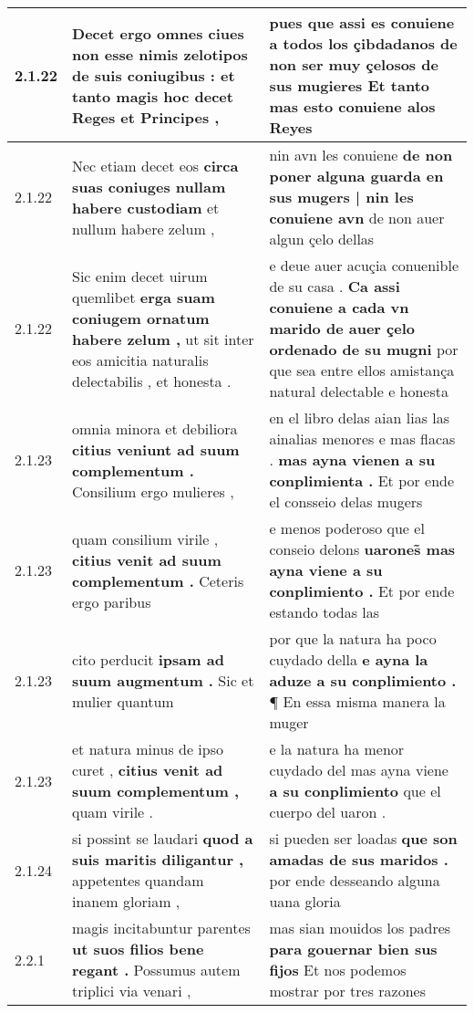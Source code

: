 \begin{tabular}{|p{1cm}|p{6.5cm}|p{6.5cm}|}
2.1.22 & Decet ergo omnes ciues \textbf{ non esse nimis zelotipos de suis coniugibus : } et tanto magis hoc decet Reges et Principes , & pues que assi es conuiene a todos los çibdadanos \textbf{ de non ser muy çelosos de sus mugieres } Et tanto mas esto conuiene alos Reyes \\\hline
2.1.22 & Nec etiam decet eos \textbf{ circa suas coniuges nullam habere custodiam } et nullum habere zelum , & nin avn les conuiene \textbf{ de non poner alguna guarda en sus mugers | nin les conuiene avn } de non auer algun çelo dellas \\\hline
2.1.22 & Sic enim decet uirum quemlibet \textbf{ erga suam coniugem ornatum habere zelum , } ut sit inter eos amicitia naturalis delectabilis , et honesta . & e deue auer acuçia conuenible de su casa . \textbf{ Ca assi conuiene a cada vn marido de auer çelo ordenado de su mugni } por que sea entre ellos amistança natural delectable e honesta \\\hline
2.1.23 & omnia minora et debiliora \textbf{ citius veniunt ad suum complementum . } Consilium ergo mulieres , & en el libro delas aian lias las ainalias menores e mas flacas . \textbf{ mas ayna vienen a su conplimienta . } Et por ende el consseio delas mugers \\\hline
2.1.23 & quam consilium virile , \textbf{ citius venit ad suum complementum . } Ceteris ergo paribus & e menos poderoso que el conseio delons \textbf{ uarones̃ mas ayna viene a su conplimiento . } Et por ende estando todas las \\\hline
2.1.23 & cito perducit \textbf{ ipsam ad suum augmentum . } Sic et mulier quantum & por que la natura ha poco cuydado della \textbf{ e ayna la aduze a su conplimiento . } ¶ En essa misma manera la muger \\\hline
2.1.23 & et natura minus de ipso curet , \textbf{ citius venit ad suum complementum , } quam virile . & e la natura ha menor cuydado del mas ayna viene \textbf{ a su conplimiento } que el cuerpo del uaron . \\\hline
2.1.24 & si possint se laudari \textbf{ quod a suis maritis diligantur , } appetentes quandam inanem gloriam , & si pueden ser loadas \textbf{ que son amadas de sus maridos . } por ende desseando alguna uana gloria \\\hline
2.2.1 & magis incitabuntur parentes \textbf{ ut suos filios bene regant . } Possumus autem triplici via venari , & mas sian mouidos los padres \textbf{ para gouernar bien sus fijos } Et nos podemos mostrar por tres razones \\\hline

\end{tabular}
